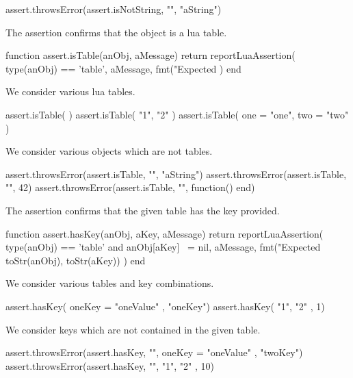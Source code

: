\startLuaTest
  assert.throwsError(assert.isNotString, "", "aString")
\stopLuaTest
\stopTestCase

\stopTestSuite


The  assertion confirms that the object is a lua 
table. 

\startLuaCode
function assert.isTable(anObj, aMessage)
  return reportLuaAssertion(
    type(anObj) == 'table',
    aMessage,
    fmt("Expected %
  )
end
\stopLuaCode


We consider various lua tables.

\startLuaTest
  assert.isTable({ })
  assert.isTable({ "1", "2" })
  assert.isTable({ one = "one", two = "two" })
\stopLuaTest
\stopTestCase


We consider various objects which are not tables. 

\startLuaTest
  assert.throwsError(assert.isTable, "", "aString")
  assert.throwsError(assert.isTable, "", 42)
  assert.throwsError(assert.isTable, "", function() end)
\stopLuaTest
\stopTestCase

\stopTestSuite


The  assertion confirms that the given table has the 
key provided. 

\startLuaCode
function assert.hasKey(anObj, aKey, aMessage)
  return reportLuaAssertion(
    type(anObj) == 'table' and anObj[aKey] ~= nil,
    aMessage,
    fmt("Expected %
      toStr(anObj), toStr(aKey))
  )
end
\stopLuaCode


We consider various tables and key combinations.

\startLuaTest
  assert.hasKey({ oneKey = "oneValue" }, "oneKey")
  assert.hasKey({ "1", "2" }, 1)
\stopLuaTest
\stopTestCase


We consider keys which are not contained in the given table. 

\startLuaTest
  assert.throwsError(assert.hasKey, "",
    { oneKey = "oneValue" }, "twoKey")
  assert.throwsError(assert.hasKey, "",
    { "1", "2" }, 10)
\stopLuaTest
\stopTestCase

